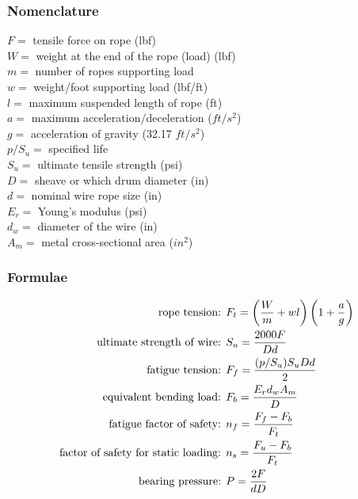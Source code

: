 \documentclass[11pt, fleqn]{article}
\begin{document}
\subsubsection{Nomenclature}
$F=$ tensile force on rope (lbf)\\
$W=$ weight at the end of the rope (load) (lbf)\\
$m=$ number of ropes supporting load\\
$w=$ weight/foot supporting load (lbf/ft)\\
$l=$ maximum suspended length of rope (ft)\\
$a=$ maximum acceleration/deceleration ($ft/s^2$)\\
$g=$ acceleration of gravity (32.17 $ft/s^2$)\\
$p/S_u=$ specified life\\
$S_u=$ ultimate tensile strength (psi)\\
$D=$ sheave or which drum diameter (in)\\
$d=$ nominal wire rope size (in)\\
$E_r=$ Young's modulus (psi)\\
$d_w=$ diameter of the wire (in)\\
$A_m=$ metal cross-sectional area ($in^2$)\\

\subsubsection{Formulae}
\begin{align*}
    \text{rope tension: }& F_t=\left( \frac{W}{m}+wl \right)\left( 1+\frac{a}{g} \right)\\
    \text{ultimate strength of wire: }& S_u = \frac{2000F}{Dd}\\
    \text{fatigue tension: }& F_f=\frac{(p/S_u)S_uDd}{2}\\
    \text{equivalent bending load: }& F_b=\frac{E_rd_wA_m}{D}\\
    \text{fatigue factor of safety: }& n_f=\frac{F_f-F_b}{F_t}\\
    \text{factor of safety for static loading: }& n_s=\frac{F_u-F_b}{F_t}\\
    \text{bearing pressure: }& P=\frac{2F}{dD}
\end{align*}
\end{document}
